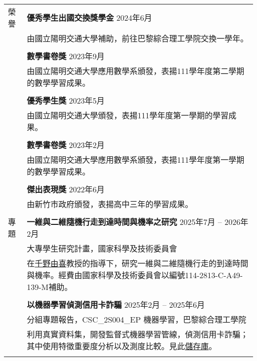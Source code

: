 \documentclass[letterpaper, 11pt]{article}
\begin{document}
\begin{CJK*}{UTF8}{bsmi}
\begin{center}
\begin{longtable}{p{0.72in}p{5.97in}}
        
        {\textcolor{OliveGreen}{榮譽}} & \textbf{優秀學生出國交換獎學金} \hfill 2024年6月\\
        & 由國立陽明交通大學補助，前往巴黎綜合理工學院交換一學年。 \\
        & \\
        & \textbf{數學書卷獎} \hfill 2023年9月\\
        & 由國立陽明交通大學應用數學系頒發，表揚111學年度第二學期的數學學習成果。\\
        & \\
        & \textbf{優秀學生獎} \hfill 2023年5月\\
        & 由國立陽明交通大學頒發，表揚111學年度第一學期的學習成果。\\
        & \\
        & \textbf{數學書卷獎} \hfill 2023年2月\\
        & 由國立陽明交通大學應用數學系頒發，表揚111學年度第一學期的數學學習成果。\\
        & \\
        & \textbf{傑出表現獎} \hfill 2022年6月\\
        & 由新竹市政府頒發，表揚高中三年的學習成果。\\
        & \\
        
        {\textcolor{OliveGreen}{專題}} & \textbf{一維與二維隨機行走到達時間與機率之研究} \hfill 2025年7月 -- 2026年2月 \\
        & 大專學生研究計畫，國家科學及技術委員會 \\
        & 在\href{https://scholar.nycu.edu.tw/en/persons/yuki-chino}{千野由喜}教授的指導下，研究一維與二維隨機行走的到達時間與機率。經費由國家科學及技術委員會以編號114-2813-C-A49-139-M補助。\\
        & \\

        & \textbf{以機器學習偵測信用卡詐騙} \hfill 2025年2月 -- 2025年6月 \\ 
        & 分組專題報告，CSC\_2S004\_EP 機器學習，巴黎綜合理工學院 \\
        & 利用真實資料集，開發監督式機器學習管線，偵測信用卡詐騙；其中使用特徵重要度分析以及測度比較。見此\href{https://github.com/eiken59/ml_project/blob/main/README.md}{儲存庫}。\\
        & \\


\end{longtable}
\end{center}
\end{CJK*}
\end{document}
